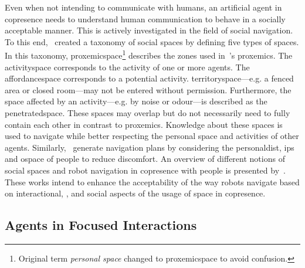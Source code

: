 Even when not intending to communicate with humans, an \gls{artificial agent} in \gls{copresence} needs to understand human communication to behave in a socially acceptable manner.
This is actively investigated in the field of social navigation.
To this end,~ created a taxonomy of social spaces by defining five types of spaces.
In this taxonomy, \Gls{proxemicspace}\footnote{Original term \emph{personal space} changed to \gls{proxemicspace} to avoid confusion.} describes the zones used in~\citeauthor*{Hall1969}'s \gls{proxemics}.
The \gls{activityspace} corresponds to the activity of one or more agents.
The \gls{affordancespace} corresponds to a potential activity.
\Gls{territoryspace}---e.g. a fenced area or closed room---may not be entered without permission.
Furthermore, the space affected by an activity---e.g. by noise or odour---is described as the \gls{penetratedspace}.
These spaces may overlap but do not necessarily need to fully contain each other in contrast to \gls{proxemics}.
Knowledge about these spaces is used to navigate while better respecting the personal space and activities of other agents.
Similarly,~ generate navigation plans by considering the \gls{personaldist}, \gls{ips} and \gls{ospace} of people to reduce discomfort.
An overview of different notions of social spaces and \gls{robot} navigation in \gls{copresence} with people is presented by~.
These works intend to enhance the acceptability of the way \glspl{robot} navigate based on interactional, , and social aspects of the usage of space in \gls{copresence}.

\subsection{Agents in Focused Interactions}\label{sec.rw.hi.focused-rw}

